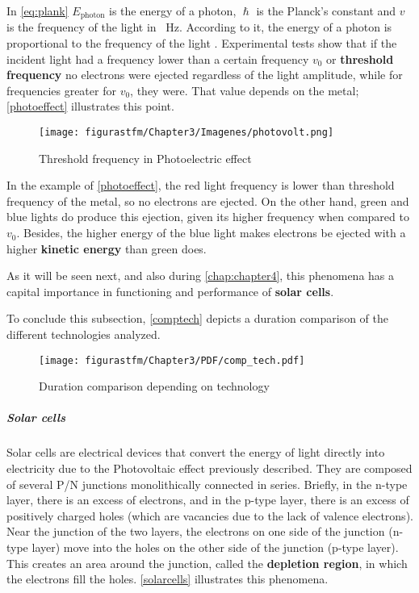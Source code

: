 In \autoref{eq:plank} $E_{\text{photon}}$ is the energy of a photon, $\hslash$ is the Planck's constant and $v$ is the frequency of the light in \SI{}{\hertz}. According to it, the energy of a photon is proportional to the frequency of the light \cite{photoelec}. Experimental tests show that if the incident light had a frequency lower than a certain frequency $v_{0}$ or \textbf{threshold frequency} no electrons were ejected regardless of the light amplitude, while for frequencies greater for $v_{0}$, they were. That value depends on the metal; \autoref{photoeffect} illustrates this point.


			\begin{figure}[H] 
				\centering
				\texttt{[image: figurastfm/Chapter3/Imagenes/photovolt.png]}
				\caption{Threshold frequency in Photoelectric effect \cite{wiki}}      		
				\label{photoeffect}
  		\end{figure}

In the example of \autoref{photoeffect}, the red light frequency is lower than threshold frequency of the metal, so no electrons are ejected. On the other hand, green and blue lights do produce this ejection, given its higher frequency when compared to $v_{0}$. Besides, the higher energy of the blue light makes electrons be ejected with a higher \textbf{kinetic energy} than green does.

As it will be seen next, and also during \autoref{chap:chapter4}, this phenomena has a capital importance in functioning and performance of \textbf{solar cells}.

To conclude this subsection, \autoref{comptech} depicts a duration comparison of the different technologies analyzed.


			\begin{figure}[H] 
				\centering
				\texttt{[image: figurastfm/Chapter3/PDF/comp\_tech.pdf]}
				\caption{Duration comparison depending on technology \cite{mit}}      		
				\label{comptech}
				\vspace{-0.5cm}
  		\end{figure}
		

\subparagraph{Solar cells} \label{scellssect}


Solar cells are electrical devices that convert the energy of light directly into electricity due to the Photovoltaic effect previously described. They are composed of several P/N junctions monolithically connected in series. Briefly, in the n-type layer, there is an excess of electrons, and in the p-type layer, there is an excess of positively charged holes (which are vacancies due to the lack of valence electrons). Near the junction of the two layers, the electrons on one side of the junction (n-type layer) move into the holes on the other side of the junction (p-type layer). This creates an area around the junction, called the \textbf{depletion region}, in which the electrons fill the holes. \autoref{solarcells} illustrates this phenomena.

